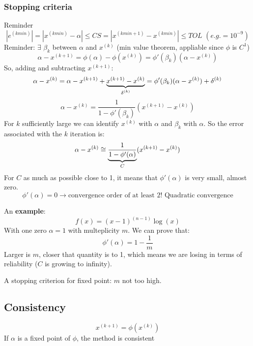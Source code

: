 \subsubsection{Stopping criteria}
Reminder
$$
\left|e^{(kmin)}\right|=\left|x^{(kmin)}-\alpha\right|\leq CS=\left|x^{(kmin+1)}-x^{(kmin)}\right|\leq TOL\,\,(e.g.=10^{-9})
$$
Reminder: $\exists\,\,\beta_k$ between $\alpha$ and $x^{(k)}$ (min value theorem, appliable since $\phi$ is $C^1$)
$$
\alpha-x^{(k+1)}=\phi(\alpha)-\phi(x^{(k)})=\phi'(\beta_k)(\alpha-x^{(k)})
$$
So, adding and subtracting $x^{(k+1)}$:
$$
\alpha-x^{(k)}=\alpha-x^{(k+1)}+\underlabel{x^{(k+1)}-x^{(k)}}{$\delta^{(k)}$}=\phi'(\beta_k)(\alpha-x^{(k)})+\delta^{(k)}
$$
$$
\alpha-x^{(k)}=\frac{1}{1-\phi'(\beta_k)}(x^{(k+1)}-x^{(k)})
$$
For $k$ sufficiently large we can identify $x^{(k)}$ with $\alpha$ and $\beta_k$ with $\alpha$. So the error associated with the $k$ iteration is:
$$
\alpha-x^{(k)}\cong\underlabel{\frac{1}{1-\phi'(\alpha)}}{$C$}(x^{(k+1)}-x^{(k)})
$$
For $C$ as much as possible close to 1, it means that $\phi'(\alpha)$ is very small, almost zero.
$$
\phi'(\alpha)=0\rightarrow\text{convergence order of at least 2! Quadratic convergence}
$$

An \textbf{example}:
$$
f(x)=(x-1)^{(n-1)}\log(x)
$$
With one zero $\alpha=1$ with multeplicity $m$. We can prove that:
$$\phi'(\alpha)=1-\frac{1}{m}$$
Larger is $m$, closer that quantity is to 1, which means we are losing in terms of reliability ($C$ is growing to infinity).

\begin{figure}[!ht]
    \begin{minipage}{\linewidth}
        \centering
    \end{minipage}
\end{figure}

A stopping criterion for fixed point: $m$ not too high.

\subsection{Consistency}
$$
x^{(k+1)}=\phi(x^{(k)})
$$
If $\alpha$ is a fixed point of $\phi$, the method is consistent